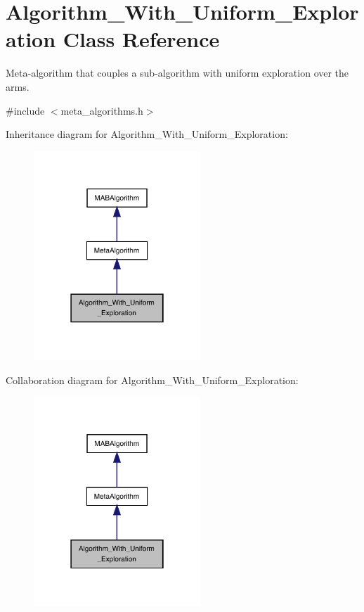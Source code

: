 \hypertarget{class_algorithm___with___uniform___exploration}{}\section{Algorithm\+\_\+\+With\+\_\+\+Uniform\+\_\+\+Exploration Class Reference}
\label{class_algorithm___with___uniform___exploration}


Meta-\/algorithm that couples a sub-\/algorithm with uniform exploration over the arms.  




{\ttfamily \#include $<$meta\+\_\+algorithms.\+h$>$}



Inheritance diagram for Algorithm\+\_\+\+With\+\_\+\+Uniform\+\_\+\+Exploration\+:
\nopagebreak
\begin{figure}[H]
\begin{center}
\leavevmode
\includegraphics[width=178pt]{class_algorithm___with___uniform___exploration__inherit__graph}
\end{center}
\end{figure}


Collaboration diagram for Algorithm\+\_\+\+With\+\_\+\+Uniform\+\_\+\+Exploration\+:
\nopagebreak
\begin{figure}[H]
\begin{center}
\leavevmode
\includegraphics[width=178pt]{class_algorithm___with___uniform___exploration__coll__graph}
\end{center}
\end{figure}
